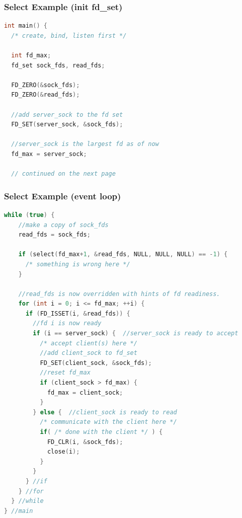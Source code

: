 \documentclass[aspectratio=43]{beamer}
\begin{document}
\begin{frame}[fragile]
  \frametitle{Select Example (init fd\_set)}
       \begin{lstlisting}[language=C++,basicstyle=\ttfamily\footnotesize,commentstyle=\color{commgreen},keywordstyle=\color{blue},breaklines=true]
int main() {
  /* create, bind, listen first */
    
  int fd_max;
  fd_set sock_fds, read_fds;
    
  FD_ZERO(&sock_fds); 
  FD_ZERO(&read_fds);

  //add server_sock to the fd set
  FD_SET(server_sock, &sock_fds);

  //server_sock is the largest fd as of now
  fd_max = server_sock;
  
  // continued on the next page
  \end{lstlisting}
\end{frame}


\begin{frame}[fragile]
  \frametitle{Select Example (event loop) }
 \begin{lstlisting}[language=C++,basicstyle=\ttfamily\tiny,commentstyle=\color{commgreen},keywordstyle=\color{blue},breaklines=true]
  while (true) {
    //make a copy of sock_fds
    read_fds = sock_fds;
        
    if (select(fd_max+1, &read_fds, NULL, NULL, NULL) == -1) {
      /* something is wrong here */
    }
        
    //read_fds is now overridden with hints of fd readiness.
    for (int i = 0; i <= fd_max; ++i) {
      if (FD_ISSET(i, &read_fds)) {
        //fd i is now ready
        if (i == server_sock) {  //server_sock is ready to accept
          /* accept client(s) here */      
          //add client_sock to fd_set
          FD_SET(client_sock, &sock_fds);
          //reset fd_max
          if (client_sock > fd_max) { 
            fd_max = client_sock;
          }
        } else {  //client_sock is ready to read
          /* communicate with the client here */    
          if( /* done with the client */ ) {
            FD_CLR(i, &sock_fds); 
            close(i);
          }
        }
      } //if
    } //for
  } //while
} //main
       \end{lstlisting}
\end{frame}
\end{document}
